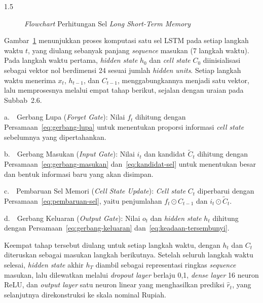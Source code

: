 \documentclass[12pt, a4paper, onecolumn, oneside]{report}
\begin{document}
\begin{spacing}{1.5}
\begin{figure}[H]
{%
    }
    \caption{\textit{Flowchart} Perhitungan Sel \textit{Long Short-Term Memory}}
    \label{fig:sel_lstm}
\end{figure}

Gambar~\ref{fig:sel_lstm} menunjukkan proses komputasi satu sel LSTM pada setiap langkah waktu $t$, yang diulang sebanyak panjang \textit{sequence} masukan (7 langkah waktu). Pada langkah waktu pertama, \textit{hidden state} $h_0$ dan \textit{cell state} $C_0$ diinisialisasi sebagai vektor nol berdimensi 24 sesuai jumlah \textit{hidden units}. Setiap langkah waktu menerima $x_t$, $h_{t-1}$, dan $C_{t-1}$, menggabungkannya menjadi satu vektor, lalu memprosesnya melalui empat tahap berikut, sejalan dengan uraian pada Subbab~2.6.

\noindent a.~~Gerbang Lupa (\textit{Forget Gate}): Nilai $f_t$ dihitung dengan Persamaan~\ref{eq:gerbang-lupa} untuk menentukan proporsi informasi \textit{cell state} sebelumnya yang dipertahankan.

\noindent b.~~Gerbang Masukan (\textit{Input Gate}): Nilai $i_t$ dan kandidat $\tilde{C}_t$ dihitung dengan Persamaan~\ref{eq:gerbang-masukan} dan~\ref{eq:kandidat-sel} untuk menentukan besar dan bentuk informasi baru yang akan disimpan.

\noindent c.~~Pembaruan Sel Memori (\textit{Cell State Update}): \textit{Cell state} $C_t$ diperbarui dengan Persamaan~\ref{eq:pembaruan-sel}, yaitu penjumlahan $f_t \odot C_{t-1}$ dan $i_t \odot \tilde{C}_t$.

\noindent d.~~Gerbang Keluaran (\textit{Output Gate}): Nilai $o_t$ dan \textit{hidden state} $h_t$ dihitung dengan Persamaan~\ref{eq:gerbang-keluaran} dan~\ref{eq:keadaan-tersembunyi}.

Keempat tahap tersebut diulang untuk setiap langkah waktu, dengan $h_t$ dan $C_t$ diteruskan sebagai masukan langkah berikutnya. Setelah seluruh langkah waktu selesai, \textit{hidden state} akhir $h_T$ diambil sebagai representasi ringkas \textit{sequence} masukan, lalu dilewatkan melalui \textit{dropout layer} berlaju 0,1, \textit{dense layer} 16 neuron ReLU, dan \textit{output layer} satu neuron linear yang menghasilkan prediksi $\hat{r}_t$, yang selanjutnya direkonstruksi ke skala nominal Rupiah.


\end{spacing}
\end{document}
